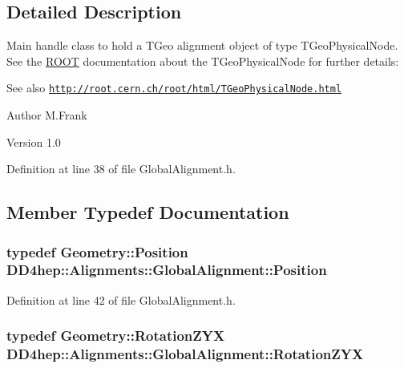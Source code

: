 \subsection{Detailed Description}
Main handle class to hold a TGeo alignment object of type TGeoPhysicalNode. See the \hyperlink{namespace_r_o_o_t}{ROOT} documentation about the TGeoPhysicalNode for further details: \begin{DoxySeeAlso}{See also}
\href{http://root.cern.ch/root/html/TGeoPhysicalNode.html}{\tt http://root.cern.ch/root/html/TGeoPhysicalNode.html}
\end{DoxySeeAlso}
\begin{DoxyAuthor}{Author}
M.Frank 
\end{DoxyAuthor}
\begin{DoxyVersion}{Version}
1.0 
\end{DoxyVersion}


Definition at line 38 of file GlobalAlignment.h.

\subsection{Member Typedef Documentation}
\hypertarget{class_d_d4hep_1_1_alignments_1_1_global_alignment_a9cd5167ec3a33a95ca76a9c7fe06271e}{
\subsubsection[{Position}]{\setlength{\rightskip}{0pt plus 5cm}typedef {\bf Geometry::Position} {\bf DD4hep::Alignments::GlobalAlignment::Position}}}
\label{class_d_d4hep_1_1_alignments_1_1_global_alignment_a9cd5167ec3a33a95ca76a9c7fe06271e}


Definition at line 42 of file GlobalAlignment.h.\hypertarget{class_d_d4hep_1_1_alignments_1_1_global_alignment_af30b8cf1e2dbdfb67f6819ef88e02478}{
\subsubsection[{RotationZYX}]{\setlength{\rightskip}{0pt plus 5cm}typedef {\bf Geometry::RotationZYX} {\bf DD4hep::Alignments::GlobalAlignment::RotationZYX}}}
\label{class_d_d4hep_1_1_alignments_1_1_global_alignment_af30b8cf1e2dbdfb67f6819ef88e02478}


